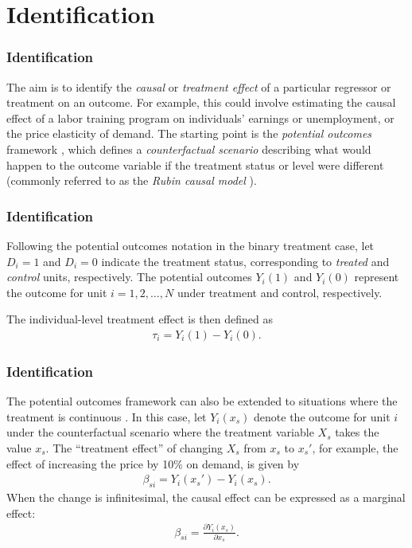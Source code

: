 \documentclass[12pt, compress]{beamer}
\begin{document}
\section{Identification}

\begin{frame}
	\frametitle{Identification}
The aim is to identify the \textit{causal} or \textit{treatment effect} of a particular regressor or treatment on an outcome. For example, this could involve estimating the causal effect of a labor training program on individuals’ earnings or unemployment, or the price elasticity of demand. The starting point is the \textit{potential outcomes} framework \citep{rubin1974}, which defines a \textit{counterfactual scenario} describing what would happen to the outcome variable if the treatment status or level were different (commonly referred to as the \textit{Rubin causal model} \citep{holland1986statistics}).
\end{frame}

\begin{frame}
	\frametitle{Identification}
Following the potential outcomes notation in the binary treatment case, let $D_i = 1$ and $D_i = 0$ indicate the treatment status, corresponding to \textit{treated} and \textit{control} units, respectively. The potential outcomes $Y_i(1)$ and $Y_i(0)$ represent the outcome for unit $i = 1, 2, \dots, N$ under treatment and control, respectively.

The individual-level treatment effect is then defined as
\begin{align*}
	\tau_i = Y_i(1) - Y_i(0).
\end{align*}
\end{frame}

\begin{frame}
	\frametitle{Identification}
The potential outcomes framework can also be extended to situations where the treatment is continuous \citep{imbens2014ivperspective}. In this case, let $Y_i(x_s)$ denote the outcome for unit $i$ under the counterfactual scenario where the treatment variable $X_s$ takes the value $x_s$. The ``treatment effect'' of changing $X_s$ from $x_s$ to $x_s'$, for example, the effect of increasing the price by 10\% on demand, is given by
\begin{align*}
	\beta_{si} = Y_i(x_s') - Y_i(x_s).
\end{align*}
When the change is infinitesimal, the causal effect can be expressed as a marginal effect:
\begin{align*}
	\beta_{si} =\frac{\partial Y_i(x_s)}{\partial x_s}.
\end{align*}
\end{frame}
\end{document}
